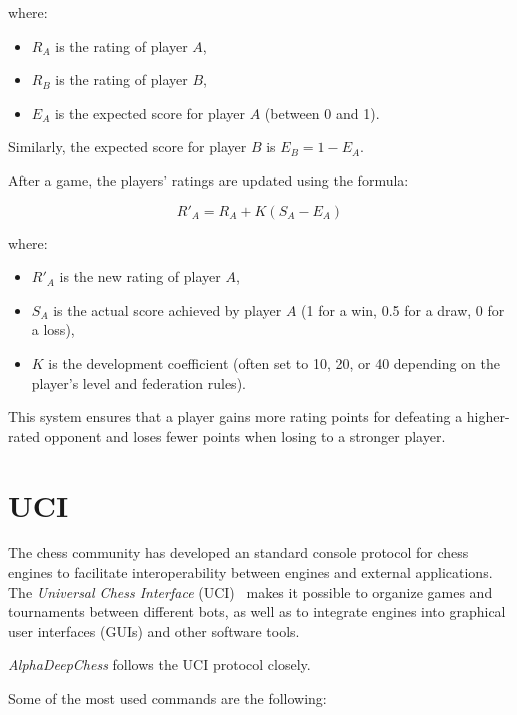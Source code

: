 where:
\begin{itemize}
  \item \( R_A \) is the rating of player \( A \),
  \item \( R_B \) is the rating of player \( B \),
  \item \( E_A \) is the expected score for player \( A \) (between 0 and 1).
\end{itemize}

Similarly, the expected score for player \( B \) is \( E_B = 1 - E_A \).

After a game, the players' ratings are updated using the formula:

\[
R'_A = R_A + K (S_A - E_A)
\]

where:
\begin{itemize}
  \item \( R'_A \) is the new rating of player \( A \),
  \item \( S_A \) is the actual score achieved by player \( A \) (1 for a win, 0.5 for a draw, 0 for a loss),
  \item \( K \) is the development coefficient (often set to 10, 20, or 40 depending on the player's level and federation rules).
\end{itemize}

This system ensures that a player gains more rating points for defeating a higher-rated opponent and loses fewer points when losing to a stronger player.

\newpage

\section{UCI}
\label{sec:uci}

\noindent The chess community has developed an standard console protocol for chess engines to facilitate interoperability between engines and external applications. The \textit{Universal Chess Interface} (UCI)~\cite{UciProtocol} makes it possible to organize games and tournaments between different bots, as well as to integrate engines into graphical user interfaces (GUIs) and other software tools.

\vspace{1em}

\textit{AlphaDeepChess} follows the UCI protocol closely.

\vspace{1em}

\noindent Some of the most used commands are the following:


